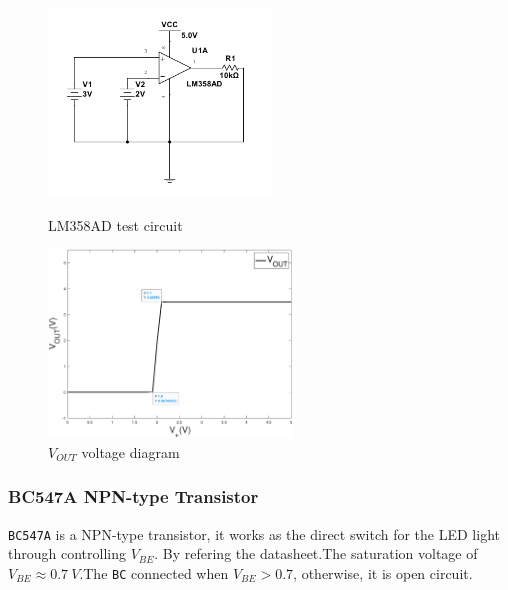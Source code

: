 \documentclass[12pt]{article}
\numberwithin{equation}{section}
\begin{document}
\begin{figure}[H]
\centering
\begin{minipage}[t]{0.48\textwidth}
\centering
\includegraphics[height=5cm]{LM358_test.pdf}
\caption{LM358AD test circuit}
\label{fig.LM35}
\end{minipage}
\begin{minipage}[t]{0.48\textwidth}
\centering
\includegraphics[height=5cm]{LM358AD_test.eps}
\caption{$V_{OUT}$ voltage diagram}
\end{minipage}
\end{figure}












\subsubsection{BC547A NPN-type Transistor \cite{BC547A}}
\verb|BC547A| is a NPN-type transistor, it works as the direct switch for the LED light through controlling $V_{BE}$. By refering the datasheet\cite{BC547A}.The saturation voltage of $V_{BE} \approx \qty{0.7}{V}$.The \verb|BC| connected when $V_{BE} >0.7$, otherwise, it is open circuit.
\end{document}
